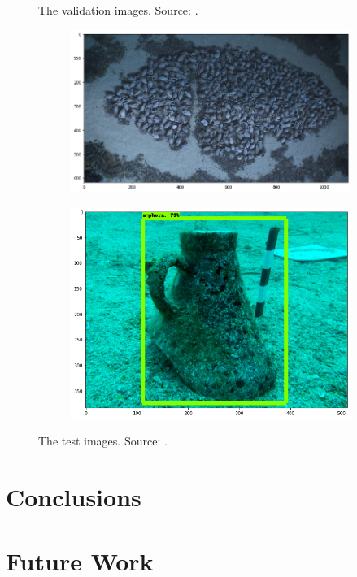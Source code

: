 \documentclass[a4paper, 11pt, oneside]{article}
\begin{document}
\begin{figure}[ht]
\begin{subfigure}[ht]{0.4\textwidth}
    \end{subfigure}
    \caption{The validation images. Source:
    \cite{scuba, itinari, whoi, phoenician, auscape, hakai, groplan}.}
    \label{fig:val}
\end{figure}

  \begin{figure}[ht]
    \centering
    \begin{subfigure}[ht]{0.8\textwidth}
        \centering
        \includegraphics[width=\textwidth]{test_1.png}
    \end{subfigure}
    \bigskip
    \begin{subfigure}[ht]{0.8\textwidth}
        \centering
        \includegraphics[width=\textwidth]{test_2.png}
    \end{subfigure}
    \caption{The test images. Source: \cite{ionian, sanisera}.}
    \label{fig:test}
  \end{figure}

  \clearpage

  \section{Conclusions}

  \section{Future Work}

  \newpage

  \printbibliography
\end{document}
